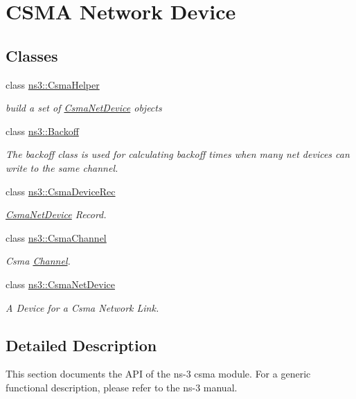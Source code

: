\hypertarget{group__csma}{}\section{C\+S\+MA Network Device}
\label{group__csma}
\subsection*{Classes}
\begin{DoxyCompactItemize}
\item 
class \hyperlink{classns3_1_1CsmaHelper}{ns3\+::\+Csma\+Helper}
\begin{DoxyCompactList}\small\item\em build a set of \hyperlink{classns3_1_1CsmaNetDevice}{Csma\+Net\+Device} objects \end{DoxyCompactList}\item 
class \hyperlink{classns3_1_1Backoff}{ns3\+::\+Backoff}
\begin{DoxyCompactList}\small\item\em The backoff class is used for calculating backoff times when many net devices can write to the same channel. \end{DoxyCompactList}\item 
class \hyperlink{classns3_1_1CsmaDeviceRec}{ns3\+::\+Csma\+Device\+Rec}
\begin{DoxyCompactList}\small\item\em \hyperlink{classns3_1_1CsmaNetDevice}{Csma\+Net\+Device} Record. \end{DoxyCompactList}\item 
class \hyperlink{classns3_1_1CsmaChannel}{ns3\+::\+Csma\+Channel}
\begin{DoxyCompactList}\small\item\em Csma \hyperlink{classns3_1_1Channel}{Channel}. \end{DoxyCompactList}\item 
class \hyperlink{classns3_1_1CsmaNetDevice}{ns3\+::\+Csma\+Net\+Device}
\begin{DoxyCompactList}\small\item\em A Device for a Csma Network Link. \end{DoxyCompactList}\end{DoxyCompactItemize}


\subsection{Detailed Description}
This section documents the A\+PI of the ns-\/3 csma module. For a generic functional description, please refer to the ns-\/3 manual. 